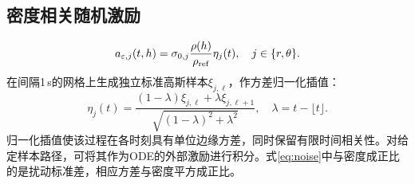 \subsection{密度相关随机激励}
\begin{equation}a_{\varepsilon,j}(t,h)=\sigma_{0,j}\frac{\rho(h)}{\rho_{\rm ref}}\eta_j(t),\quad j\in\{r,\theta\}.\label{eq:noise}\end{equation}
在间隔1\,s的网格上生成独立标准高斯样本$\xi_{j,\ell}$，作方差归一化插值：
\begin{equation}\eta_j(t)=\frac{(1-\lambda)\xi_{j,\ell}+\lambda\xi_{j,\ell+1}}{\sqrt{(1-\lambda)^2+\lambda^2}},\quad\lambda=t-\lfloor t\rfloor.\end{equation}
归一化插值使该过程在各时刻具有单位边缘方差，同时保留有限时间相关性。对给定样本路径，可将其作为ODE的外部激励进行积分。式\eqref{eq:noise}中与密度成正比的是扰动标准差，相应方差与密度平方成正比。

